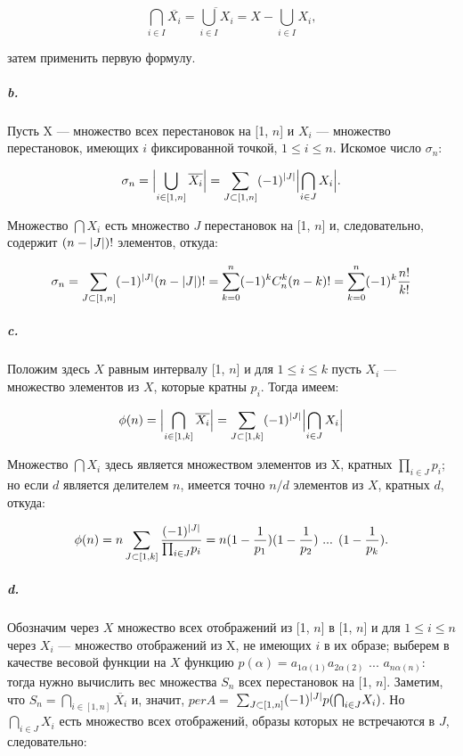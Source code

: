 \documentclass{../../template/mai_book}
\DeclarePairedDelimiter{\abs}{\lvert}{\rvert}
\begin{document}
\begin{equation*}
\bigcap_{i \in I} \overline{X_i} = \overline{\bigcup_{i \in I} X_i} = X - \bigcup_{i \in I} X_i,
\end{equation*}

\noindent
затем применить первую формулу.

\subparagraph{b.} Пусть X — множество всех перестановок на [1, $n$] и $X_i$ —  множество перестановок, имеющих $i$ фиксированной точкой, $1 \leqslant i \leqslant n$. Искомое число $\sigma_n$:

\begin{equation*}
\sigma_n = \abs[\Big]{\bigcup_{i \in [1, n]} \overline{X_i}} = \sum_{J \subset [1, n]} (-1)^{\abs{J}} \abs[\Big]{\bigcap_{i \in J} X_i}.
\end{equation*}

\noindent
Множество $\bigcap X_i$ есть множество $J$ перестановок на [1, $n$] и, следовательно, содержит $(n - \abs{J})!$ элементов, откуда:

\begin{equation*}
\sigma_n = \sum_{J \subset [1, n]} (-1)^{\abs{J}} (n - \abs{J})! = \sum_{k = 0}^n (-1)^k C_n^k(n - k)! = \sum_{k = 0}^n (-1)^k \frac{n!}{k!}
\end{equation*}

\newpage


\subparagraph{c.} Положим здесь $X$ равным интервалу [1, $n$] и для $1 \leqslant i \leqslant k$ пусть $X_i$ — множество элементов из $X$, которые кратны $p_i$. Тогда имеем:

\begin{equation*}
\phi(n) = \abs[\Big]{\bigcap_{i \in [1, k]} \overline{X_i}} = \sum_{J \subset [1, k]} (-1)^{\abs{J}} \abs[\Big]{\bigcap_{i \in J} X_i}
\end{equation*}

\noindent
Множество $\bigcap X_i$ здесь является множеством элементов из X, кратных ${\prod}_{i \in J} p_i$; но если $d$ является делителем $n$, имеется точно $n / d$ элементов из $X$, кратных $d$, откуда:

\begin{equation*}
\phi(n) = n \sum_{J \subset [1, k]} \frac{(-1)^{\abs{J}}}{{\prod}_{i \in J} p_i} = n (1 - \frac{1}{p_1}) (1 - \frac{1}{p_2}) \text{ ... } (1 - \frac{1}{p_k}).
\end{equation*}

\subparagraph{d.} Обозначим через $X$ множество всех отображений из [1, $n$] в [1, $n$] и для $1 \leqslant i \leqslant n$ через $X_i$ — множество отображений из X, не имеющих $i$ в их образе; выберем в качестве весовой функции на $X$ функцию $p(\alpha) = a_{1\alpha(1)} a_{2\alpha(2)} \text{ ... } a_{n\alpha(n)}$: тогда нужно вычислить вес множества $S_n$ всех перестановок на [1, $n$]. Заметим, что $S_n = {\bigcap}_{i \in [1, n]} \overline{X_i}$ и, значит, $per A =$ \linebreak ${\sum}_{J \subset [1, n]} (-1)^{\abs{J}} p({\bigcap}_{i \in J} X_i)$. Но ${\bigcap}_{i \in J} X_i$ есть множество всех отображений, образы которых не встречаются в $J$, следовательно:
\end{document}
